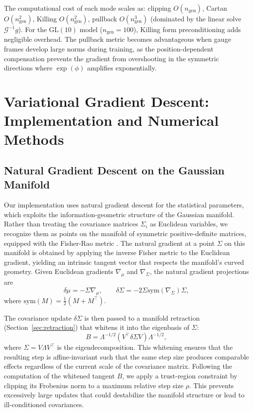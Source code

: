 \documentclass[twoside,11pt]{article}
\begin{document}
The computational cost of each mode scales as: clipping $O(n_{\mathrm{gen}})$, Cartan $O(n_{\mathrm{gen}}^2)$, Killing $O(n_{\mathrm{gen}}^2)$, pullback $O(n_{\mathrm{gen}}^3)$ (dominated by the linear solve $\mathcal{G}^{-1} g$). For the $\mathrm{GL}(10)$ model ($n_{\mathrm{gen}} = 100$), Killing form preconditioning adds negligible overhead. The pullback metric becomes advantageous when gauge frames develop large norms during training, as the position-dependent compensation prevents the gradient from overshooting in the symmetric directions where $\exp(\phi)$ amplifies exponentially.


\section{Variational Gradient Descent: Implementation and Numerical Methods}
\label{app:variational_descent}


\subsection{Natural Gradient Descent on the Gaussian Manifold}
Our implementation uses natural gradient descent for the statistical parameters, which exploits the information-geometric structure of the Gaussian manifold. Rather than treating the covariance matrices $\Sigma_i$ as Euclidean variables, we recognize them as points on the manifold of symmetric positive-definite matrices, equipped with the Fisher-Rao metric \citep{Cencov1982,amari2016information}. The natural gradient at a point $\Sigma$ on this manifold is obtained by applying the inverse Fisher metric to the Euclidean gradient, yielding an intrinsic tangent vector that respects the manifold's curved geometry. Given Euclidean gradients $\nabla_\mu$ and $\nabla_\Sigma$, the natural gradient projections are
\begin{equation}
\delta\mu = -\Sigma \nabla_\mu, \qquad
\delta\Sigma = -2 \Sigma \mathrm{sym}(\nabla_\Sigma) \Sigma,
\end{equation}
where $\mathrm{sym}(M) = \tfrac{1}{2}(M + M^\top)$.

The covariance update $\delta\Sigma$ is then passed to a manifold retraction (Section~\ref{sec:retraction}) that whitens it into the eigenbasis of $\Sigma$:
\begin{equation}
B = \Lambda^{-1/2} (V^\top \delta\Sigma V) \Lambda^{-1/2},
\end{equation}
where $\Sigma = V \Lambda V^\top$ is the eigendecomposition. This whitening ensures that the resulting step is affine-invariant such that the same step size produces comparable effects regardless of the current scale of the covariance matrix. Following the computation of the whitened tangent $B$, we apply a trust-region constraint by clipping its Frobenius norm to a maximum relative step size $\rho$. This prevents excessively large updates that could destabilize the manifold structure or lead to ill-conditioned covariances.
\end{document}
